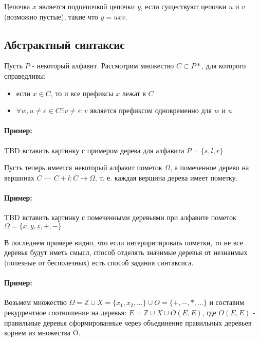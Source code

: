 \begin{Def}
Цепочка $x$ является подцепочкой цепочки $y$, если существуют цепочки $u$ и $v$ (возможно пустые), такие что $y = uxv$.
\end{Def}

\subsection{Абстрактный синтаксис}

Пусть $P$ - некоторый алфавит. Рассмотрим множество $C \subset P*$, для которого справедливы:
\begin{itemize}
\item если $x \in C$, то и все префиксы $x$ лежат в $C$

\item $\forall w,u \not= \varepsilon \in C \exists v \not= \varepsilon : v$ является префиксом одновременно для $w$ и $u$ 
\end{itemize}

\paragraph{Пример:}
TBD вставить картинку с примером дерева для алфавита $P = \{s,l,r\}$

Пусть теперь имеется некоторый алфавит пометок $\Omega$, а помеченное дерево на вершинах $C$ --- $C + l: C \rightarrow \Omega$, т. е. каждая вершина дерева
имеет пометку.

\paragraph{Пример:}
TBD вставить картинку с помеченными деревьями при алфавите пометок $\Omega = \{x,y,z,+,-\}$

В последнем примере видно, что если интерпритировать пометки, то не все деревья будут иметь смысл, способ отделять значимые деревья от незнаимых (полезные
от бесполезных) есть способ задания синтаксиса.

\paragraph{Пример:}
Возьмем множество $\Omega = \mathbb{Z}\cup X=\{x_1,x_2,...\}\cup O=\{+,-,*,...\}$ и составим рекуррентное соотношение на деревья: $E = \mathbb{Z}\cup X\cup O\left(E,E\right)$,
где $O\left(E,E\right)$ - правильные деревья сформированные через объединение правильных деревьев корнем из множества O.

